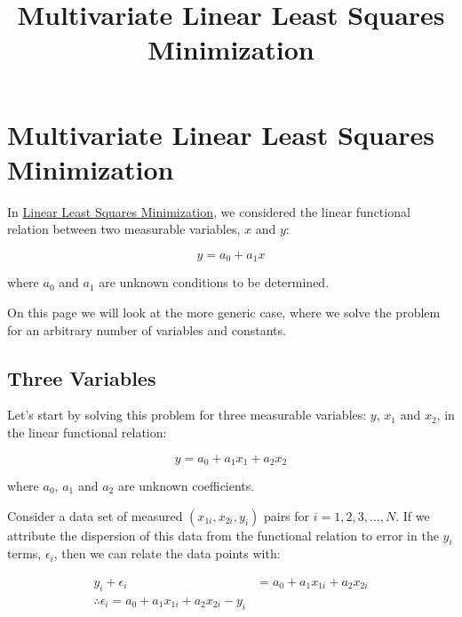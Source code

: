 \documentclass[11pt]{article}
\title{Multivariate Linear Least Squares Minimization}
\date{}
\begin{document}
    
    \maketitle
    
    

    


    \hypertarget{multivariate-linear-least-squares-minimization}{%
\section*{Multivariate Linear Least Squares
Minimization}\label{multivariate-linear-least-squares-minimization}}





    In \href{/linear-regression/least-squares}{Linear Least Squares
Minimization}, we considered the linear functional relation between two
measurable variables, \(x\) and \(y\):

\[
y = a_0 + a_1 x
\]

where \(a_0\) and \(a_1\) are unknown conditions to be determined.

On this page we will look at the more generic case, where we solve the
problem for an arbitrary number of variables and constants.





    \hypertarget{three-variables}{%
\subsection*{Three Variables}\label{three-variables}}





    Let's start by solving this problem for three measurable variables:
\(y\), \(x_1\) and \(x_2\), in the linear functional relation:

\[
y = a_0 + a_1 x_1 + a_2 x_2
\]

where \(a_0\), \(a_1\) and \(a_2\) are unknown coefficients.

Consider a data set of measured \((x_{1i}, x_{2i}, y_i)\) pairs for
\(i = 1, 2, 3, \dots , N\). If we attribute the dispersion of this data
from the functional relation to error in the \(y_i\) terms,
\(\epsilon_i\), then we can relate the data points with:

\[
\begin{align*}
y_i + \epsilon_i &= a_0 + a_1 x_{1 i} + a_2 x_{2 i}\\
\therefore \epsilon_i = a_0 + a_1 x_{1 i} + a_2 x_{2 i} - y_i\\
\end{align*}
\]
\end{document}
